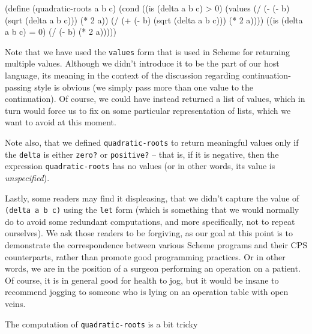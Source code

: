 \begin{Snippet}
  (define (quadratic-roots a b c)
    (cond ((is (delta a b c) > 0)
           (values (/ (- (- b) (sqrt (delta a b c))) (* 2 a))
                   (/ (+ (- b) (sqrt (delta a b c))) (* 2 a))))
          ((is (delta a b c) = 0)
           (/ (- b) (* 2 a)))))
\end{Snippet}

Note that we have used the \texttt{values} form that is used in Scheme
for returning multiple values. Although we didn't introduce it to be the
part of our host language, its meaning in the context of the discussion
regarding continuation-passing style is obvious (we simply pass more than
one value to the continuation). Of course, we could have instead returned
a list of values, which in turn would force us to fix on some particular
representation of lists, which we want to avoid at this moment.

Note also, that we defined \texttt{quadratic-roots} to return meaningful
values only if the \texttt{delta} is either \texttt{zero?}
or \texttt{positive?} -- that is, if it is negative, then the expression
\texttt{quadratic-roots} has no values (or in other words, its value
is \textit{unspecified}).

Lastly, some readers may find it displeasing, that we didn't capture
the value of \texttt{(delta a b c)} using the \texttt{let} form
(which is something that we would normally do to avoid some redundant
computations, and more specifically, not to repeat ourselves).
We ask those readers to be forgiving, as our goal at this point
is to demonstrate the correspondence between various Scheme programs
and their CPS counterparts, rather than promote good programming
practices. Or in other words, we are in the position of a surgeon
performing an operation on a patient. Of course, it is in general
good for health to jog, but it would be insane to recommend
jogging to someone who is lying on an operation table with open
veins.

The computation of \texttt{quadratic-roots} is a bit tricky


